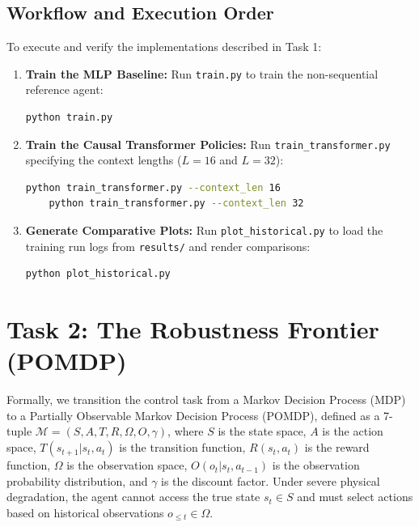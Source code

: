 \documentclass[11pt,a4paper]{article}
\begin{document}
\subsection{Workflow and Execution Order}
To execute and verify the implementations described in Task 1:
\begin{enumerate}
    \item \textbf{Train the MLP Baseline:} Run \texttt{train.py} to train the non-sequential reference agent:
    \begin{lstlisting}[language=bash]
    python train.py
    \end{lstlisting}
    \item \textbf{Train the Causal Transformer Policies:} Run \texttt{train\_transformer.py} specifying the context lengths ($L=16$ and $L=32$):
    \begin{lstlisting}[language=bash]
    python train_transformer.py --context_len 16
    python train_transformer.py --context_len 32
    \end{lstlisting}
    \item \textbf{Generate Comparative Plots:} Run \texttt{plot\_historical.py} to load the training run logs from \texttt{results/} and render comparisons:
    \begin{lstlisting}[language=bash]
    python plot_historical.py
    \end{lstlisting}
\end{enumerate}

\newpage

\section{Task 2: The Robustness Frontier (POMDP)}
Formally, we transition the control task from a Markov Decision Process (MDP) to a Partially Observable Markov Decision Process (POMDP), defined as a 7-tuple $\mathcal{M} = (S, A, T, R, \Omega, O, \gamma)$, where $S$ is the state space, $A$ is the action space, $T(s_{t+1}|s_t, a_t)$ is the transition function, $R(s_t, a_t)$ is the reward function, $\Omega$ is the observation space, $O(o_t | s_t, a_{t-1})$ is the observation probability distribution, and $\gamma$ is the discount factor. Under severe physical degradation, the agent cannot access the true state $s_t \in S$ and must select actions based on historical observations $o_{\le t} \in \Omega$.
\end{document}
